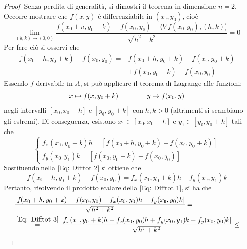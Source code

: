     \begin{proof}
        Senza perdita di generalità, si dimostri il teorema in dimensione $n=2$. Occorre mostrare che $f(x,y)$ è differenziabile in $(x_0, y_0)$, cioè
        \begin{equation} \label{Eq: Difftot 1}
            \lim_{(h,k) \to (0,0)} \frac{f(x_0+h, y_0+k)-f(x_0, y_0)-\langle\nabla f(x_0, y_0), (h,k)\rangle}{\sqrt{h^2+k^2}}=0
        \end{equation}
        Per fare ciò si osservi che
        \begin{equation} \label{Eq: Difftot 2}
            \begin{aligned}
                f(x_0+h, y_0+k)-f(x_0, y_0)=&f(x_0+h, y_0+k)-f(x_0, y_0+k)\\&+f(x_0, y_0+k)-f(x_0, y_0)
            \end{aligned}
        \end{equation}
        Essendo $f$ derivabile in $A$, si può applicare il teorema di Lagrange alle funzioni:
        \begin{equation}
            x \mapsto f(x, y_0+k) \hspace{1.5cm} y \mapsto f(x_0, y)
        \end{equation}
        negli intervalli $[x_0, x_0+h]$ e $[y_0, y_0+k]$ con $h,k>0$ (altrimenti si scambiano gli estremi).
        Di conseguenza, esistono $x_1 \in [x_0, x_0+h] $ e $y_1 \in [y_0, y_0+h]$ tali che
        \begin{equation}
            \begin{cases}
                f_x(x_1, y_0+k)h=\left[f(x_0+h, y_0+k)-f(x_0, y_0+k)\right]\\
                f_y(x_0, y_1)k=\left[f(x_0, y_0+k)-f(x_0, y_0) \right]
            \end{cases}
        \end{equation}
        Sostituendo nella \eqref{Eq: Difftot 2} si ottiene che
        \begin{equation} \label{Eq: Difftot 3}
            f(x_0+h, y_0+k)-f(x_0, y_0)=f_x(x_1, y_0+k)h+f_y(x_0, y_1)k
        \end{equation}
        Pertanto, risolvendo il prodotto scalare della \eqref{Eq: Difftot 1}, si ha che
        \begin{equation}
            \begin{aligned}
                &\frac{|f(x_0+h, y_0+k)-f(x_0, y_0)-f_x(x_0, y_0)h-f_y(x_0, y_0)k|}{\sqrt{h^2+k^2}}=\\
                &\overset{\eqref{Eq: Difftot 3}}{=}\frac{|f_x(x_1, y_0+k)h-f_x(x_0, y_0)h+f_y(x_0, y_1)k-f_y(x_0, y_0)k|}{\sqrt{h^2+k^2}}\leq\\

\end{aligned}
\end{equation}
\end{proof}
